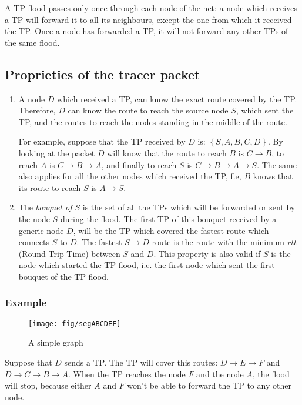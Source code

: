 \documentclass[a4paper]{article}
\begin{document}
A TP flood passes only once through each node of the net: a node which
receives a TP will forward it to all its neighbours, except the one from which
it received the TP. Once a node has forwarded a TP, it will not forward any
other TPs of the same flood.

\subsection{Proprieties of the tracer packet}
\label{sec:proprieties_TP}

\begin{enumerate}
	\item A node $D$ which received a TP, can know the exact route covered
		by the TP. Therefore, $D$ can know the route to reach the
		source node $S$, which sent the TP, and the routes to reach
		the nodes standing in the middle of the route.
		
		For example, suppose that the TP received by $D$ is: $\left\{
		S, A, B, C, D \right\}$. By looking at the packet $D$ will
		know that the route to reach $B$ is $C\rightarrow B$, to reach $A$ is
		$C\rightarrow B\rightarrow A$, and finally to reach $S$ is
		$C\rightarrow B\rightarrow A\rightarrow S$.
		The same also applies for all the other nodes which received
		the TP, f.e, $B$ knows that its route to reach $S$ is
		$A\rightarrow S$.
	\item The \emph{bouquet of $S$} is the set of all the TPs which will
		be forwarded or sent by the node $S$ during the flood.
		The first TP of this bouquet received by a generic node $D$,
		will be the TP which covered the fastest route which connects
		$S$ to $D$.
		The fastest $S \rightarrow D$ route is the route with the
		minimum \emph{rtt} (Round-Trip Time) between $S$ and $D$.
		This property is also valid if $S$ is the node which started
		the TP flood, i.e. the first node which sent the first bouquet
		of the TP flood.
\end{enumerate}


\subsubsection*{Example}
\begin{figure}[h]
	\begin{center}
		\texttt{[image: fig/segABCDEF]}
	\end{center}
	\caption{A simple graph}
\end{figure}

Suppose that $D$ sends a TP. The TP will cover this routes:
$D \rightarrow E \rightarrow F$ and $D \rightarrow C \rightarrow B \rightarrow A$.
When the TP reaches the node $F$ and the node $A$, the flood will stop,
because either $A$ and $F$ won't be able to forward the TP to any other node.
\end{document}
